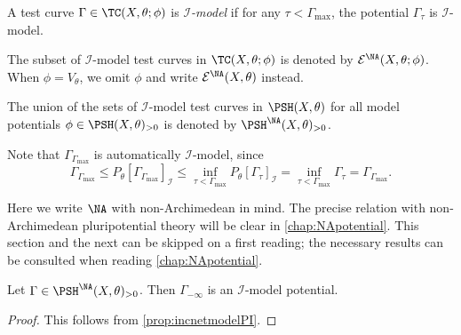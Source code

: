 \begin{definition}\label{def:Imodeltestcur}
    A test curve $\Gamma\in \TC(X,\theta;\phi)$ is \emph{$\mathcal{I}$-model} if for any $\tau<\Gamma_{\max}$, the potential $\Gamma_{\tau}$ is $\mathcal{I}$-model.

    The subset of $\mathcal{I}$-model test curves in $\TC(X,\theta;\phi)$ is denoted by $\mathcal{E}^{\NA}(X,\theta;\phi)$. When $\phi=V_{\theta}$, we omit $\phi$ and write $\mathcal{E}^{\NA}(X,\theta)$ instead.

    The union of the sets of $\mathcal{I}$-model test curves in $\PSH(X,\theta)$ for all model potentials $\phi\in \PSH(X,\theta)_{>0}$ is denoted by $\PSH^{\NA}(X,\theta)_{>0}$.
\end{definition}
Note that $\Gamma_{\Gamma_{\max}}$ is automatically $\mathcal{I}$-model, since
\[
    \Gamma_{\Gamma_{\max}}\leq P_{\theta}\left[\Gamma_{\Gamma_{\max}}\right]_{\mathcal{I}}\leq \inf_{\tau<\Gamma_{\max}}P_{\theta}\left[\Gamma_{\tau}\right]_{\mathcal{I}}=\inf_{\tau<\Gamma_{\max}}\Gamma_{\tau}=\Gamma_{\Gamma_{\max}}.
\]

Here we write $\NA$ with non-Archimedean in mind. The precise relation with non-Archimedean pluripotential theory will be clear in \cref{chap:NApotential}.
This section and the next can be skipped on a first reading; the necessary results can be consulted when reading \cref{chap:NApotential}.


\begin{proposition}\label{prop:GammaminfImodel}
    Let $\Gamma\in \PSH^{\NA}(X,\theta)_{>0}$. Then $\Gamma_{-\infty}$ is an $\mathcal{I}$-model potential.
\end{proposition}
\begin{proof}
    This follows from \cref{prop:incnetmodelPI}.
\end{proof}



